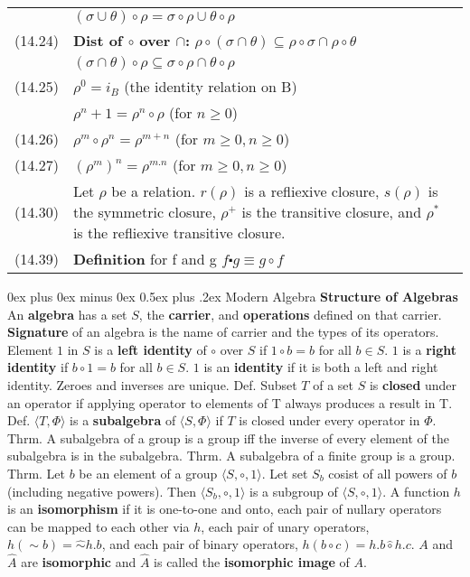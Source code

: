 \documentclass[letterpaper, 8pt]{extarticle}
\makeatletter
\renewcommand{\section}{\@startsection{section}{1}{0mm}%
                                {0ex plus 0ex minus 0ex}%
                                {0.5ex plus .2ex}%
                                {\normalfont\normalsize\bfseries}}
\makeatother
\begin{document}
\begin{multicols*}{3}
\begin{tabulary}{\linewidth}{@{}lLL@{}}
        &  $(\sigma \cup \theta) \circ \rho = \sigma \circ \rho \cup \theta \circ \rho$&\\
        (14.24) & \textbf{Dist of $\circ$ over $\cap$:} \; $\rho \circ (\sigma \cap \theta) \subseteq \rho \circ \sigma \cap \rho \circ \theta$&\\
        &  $(\sigma \cap \theta) \circ \rho \subseteq \sigma \circ \rho \cap \theta \circ \rho$&\\
        (14.25) & $\rho^0 = i_B$ (the identity relation on B)\\
        &  $\rho^n+1 = \rho^n \circ \rho$ (for $n \geq 0$)&\\
        (14.26) & $\rho^m \circ \rho^n = \rho^{m+n}$ (for $m \geq 0,n \geq 0$) &\\
        (14.27) & $(\rho^m)^n = \rho^{m.n}$ (for $m \geq 0,n \geq 0$) &\\
        (14.30) &Let $\rho$ be a relation. $r(\rho)$ is a refliexive closure, $s(\rho)$ is the symmetric closure, $\rho^+$ is the transitive closure, and $\rho^*$ is the refliexive transitive closure.& \\
        (14.39) &\textbf{Definition} for f and g $f \centerdot g \equiv g \circ f$ &\\ 
    \end{tabulary}

    \section{Modern Algebra}
    \textbf{Structure of Algebras}
    An \textbf{algebra} has a set $S$, the \textbf{carrier},
    and \textbf{operations} defined on that carrier.
    \textbf{Signature} of an algebra is the name of carrier and the types of its operators.
    Element $1$ in $S$ is a \textbf{left identity} of $\circ$ over $S$
    if $1 \circ b = b$ for all $b \in S$.
    $1$ is a \textbf{right identity} if $b \circ 1 = b$ for all $b \in S$.
    $1$ is an \textbf{identity} if it is both a left and right identity.
    Zeroes and inverses are unique.
    Def. Subset $T$ of a set $S$ is \textbf{closed} under an operator
    if applying operator to elements of T always produces a result in T.
    Def. $\langle T, \Phi \rangle$ is a \textbf{subalgebra} of $\langle S, \Phi \rangle$ if $T$ is closed under
    every operator in $\Phi$.
    Thrm. A subalgebra of a group is a group iff the inverse of every element of the subalgebra is in the subalgebra.
    Thrm. A subalgebra of a finite group is a group.
    Thrm. Let $b$ be an element of a group $\langle S, \circ, 1 \rangle$.
    Let set $S_b$ cosist of all powers of $b$ (including negative powers).
    Then $\langle S_b, \circ, 1 \rangle$ is a subgroup of $\langle S, \circ, 1 \rangle$.
    A function $h$ is an \textbf{isomorphism} if it is one-to-one and onto,
    each pair of nullary operators can be mapped to each other via $h$,
    each pair of unary operators, $h(\sim b) = \hat{\sim} h.b$,
    and each pair of binary operators, $h(b \circ c) = h.b \hat{\circ} h.c$.
    $A$ and $\hat{A}$ are \textbf{isomorphic} and $\hat{A}$ is called the \textbf{isomorphic image} of $A$.


\end{multicols*}
\end{document}
